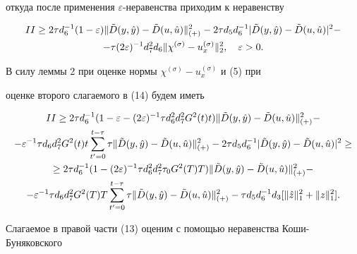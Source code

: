 откуда после применения $\varepsilon$-неравенства приходим к неравенству 


\begin{multline} 


II\ge 2 \tau d_6^{-1}(1-\varepsilon) 


\|\Tilde D(y,\Hat y)-\Tilde D(u,\Hat u)\|^2_{(+)}- 


2 \tau d_5 d_6^{-1} 


|\Tilde D(y,\Hat y)-\Tilde D(u,\Hat u)|^2- \\


-\tau(2\varepsilon)^{-1} d_7^2d_6 \|\chi^{(\sigma)}-u_x^{(\sigma)}\|_2^2, 


\quad \varepsilon >0. 


\end{multline} 


В силу леммы 2 при оценке нормы $\chi^{(\sigma)}-u_x^{(\sigma)}$ и (5) при


оценке второго слагаемого в (14) будем иметь 


\begin{gather} 


II \ge 2\tau d_6^{-1}(1-\varepsilon-(2\varepsilon)^{-1} 


\tau d_6^2 d_7^2 G^2(t)t) 


\|\Tilde D(y,\Hat y)-\Tilde D(u,\Hat u)\|^2_{(+)}-\notag \\ 


-\varepsilon^{-1}\tau d_6 d_7^2 G^2(t)t\sum^{t-\tau}_{t'=0}\tau 


\|\Tilde D(y,\Hat y)-\Tilde D(u,\Hat u)\|^2_{(+)} 


-2\tau d_5 d_6^{-1}|\Tilde D(y,\Hat y)-\Tilde D(u,\Hat u)|^2\ge 


\notag \\ 


\ge 2\tau d_6^{-1}(1-(2\varepsilon)^{-1}\tau d_6^2 d_7^2 \tau_0G^2(T)T) 


\|\Tilde D(y,\Hat y)-\Tilde D(u,\Hat u)\|^2_{(+)}- \notag\\ 


-\varepsilon^{-1}\tau d_6d_7^2G^2(T)T\sum^{t-\tau}_{t'=0}\tau 


\|\Tilde D(y,\Hat y)-\Tilde D(u,\Hat u)\|^2_{(+)}- 


\tau d_5 d_6^{-1}d_3[\|\Hat z\|^2_1+\|z\|^2_1]. 


\end{gather} 


Слагаемое в правой части (13) оценим с помощью неравенства Коши-Буняковского 


